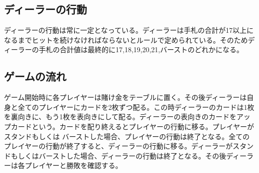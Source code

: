 \subsection{ディーラーの行動}
ディーラーの行動は常に一定となっている。ディーラーは手札の合計が17以上になるまでヒットを続けなければならないとルールで定められている。そのためディーラーの手札の合計値は最終的に17,18,19,20,21,バーストのどれかになる。

\subsection{ゲームの流れ}
ゲーム開始時に各プレイヤーは賭け金をテーブルに置く。その後ディーラーは自身と全てのプレイヤーにカードを2枚ずつ配る。この時ディーラーのカードは1枚を裏向きに、もう1枚を表向きにして配る。ディーラーの表向きのカードをアップカードという。カードを配り終えるとプレイヤーの行動に移る。プレイヤーがスタンドもしくは
バーストした場合、プレイヤーの行動は終了となる。全てのプレイヤーの行動が終了すると、ディーラーの行動に移る。ディーラーがスタンドもしくはバーストした場合、ディーラーの行動は終了となる。その後ディーラーは各プレイヤーと勝敗を確認する。
